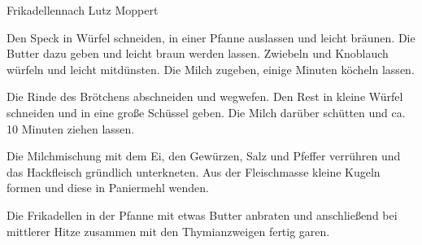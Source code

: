 \begin{recipe}{Frikadellen}{nach Lutz Moppert}
  \label{Frikadellen}
  \inglist

  \steps
  Den Speck in Würfel schneiden, in einer Pfanne auslassen und leicht bräunen. Die Butter
  dazu geben und leicht braun werden lassen. Zwiebeln und Knoblauch würfeln und leicht
  mitdünsten. Die Milch zugeben, einige Minuten köcheln lassen.

  Die Rinde des Brötchens abschneiden und wegwefen. Den Rest in kleine Würfel schneiden
  und in eine große Schüssel geben. Die Milch darüber schütten und ca. 10 Minuten ziehen
  lassen.

  Die Milchmischung mit dem Ei, den Gewürzen, Salz und Pfeffer verrühren und das
  Hackfleisch gründlich unterkneten. Aus der Fleischmasse kleine Kugeln formen und diese
  in Paniermehl wenden.

  Die Frikadellen in der Pfanne mit etwas Butter anbraten und anschließend bei mittlerer
  Hitze zusammen mit den Thymianzweigen fertig garen.
\end{recipe}

